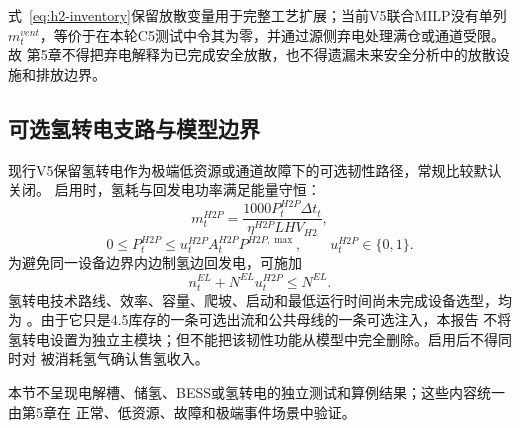 式~\eqref{eq:h2-inventory}保留放散变量用于完整工艺扩展；当前V5联合MILP没有单列
$m_t^{vent}$，等价于在本轮C5测试中令其为零，并通过源侧弃电处理满仓或通道受限。故
第5章不得把弃电解释为已完成安全放散，也不得遗漏未来安全分析中的放散设施和排放边界。

\subsection{可选氢转电支路与模型边界}

现行V5保留氢转电作为极端低资源或通道故障下的可选韧性路径，常规比较默认关闭。
启用时，氢耗与回发电功率满足能量守恒：
\begin{equation}
m_t^{H2P}=
\frac{1000P_t^{H2P}\Delta t_t}
{\eta^{H2P}LHV_{H2}},
\label{eq:h2-to-power}
\end{equation}
\begin{equation}
0\le P_t^{H2P}\le u_t^{H2P}A_t^{H2P}P^{H2P,\max},
\qquad u_t^{H2P}\in\{0,1\}.
\label{eq:h2-to-power-cap}
\end{equation}
为避免同一设备边界内边制氢边回发电，可施加
\begin{equation}
n_t^{EL}+N^{EL}u_t^{H2P}\le N^{EL}.
\label{eq:ely-h2p-exclusive}
\end{equation}
氢转电技术路线、效率、容量、爬坡、启动和最低运行时间尚未完成设备选型，均为
\assumptiontag。由于它只是4.5库存的一条可选出流和公共母线的一条可选注入，本报告
不将氢转电设置为独立主模块；但不能把该韧性功能从模型中完全删除。启用后不得同时对
被消耗氢气确认售氢收入。

本节不呈现电解槽、储氢、BESS或氢转电的独立测试和算例结果；这些内容统一由第5章在
正常、低资源、故障和极端事件场景中验证。
